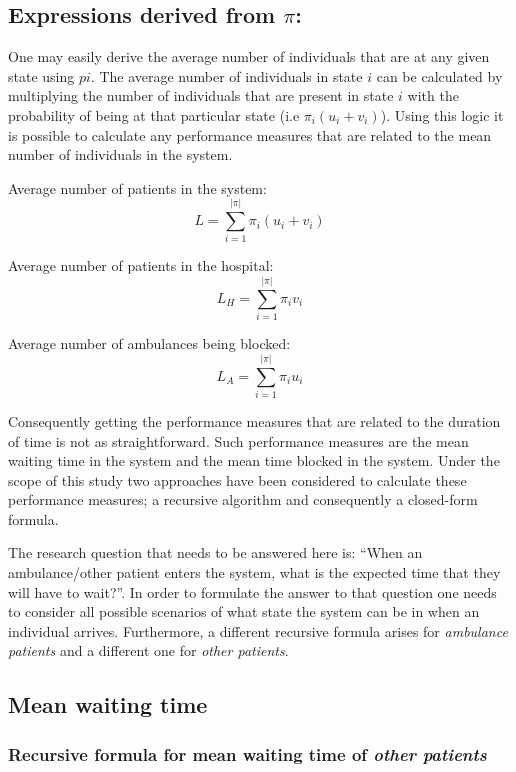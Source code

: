 \subsection{Expressions derived from \( \pi \):}
One may easily derive the average number of individuals that are at any given state using \( pi \). The average number of individuals in state \( i \) can be calculated by multiplying the number of individuals that are present in state \( i \) with the probability of being at that particular state (i.e \(\pi_i (u_i + v_i)\)). Using this logic it is possible to calculate any performance measures that are related to the mean number of individuals in the system.


Average number of patients in the system: 
\begin{equation}
    L = \sum_{i=1}^{|\pi|} \pi_i (u_i + v_i)
\end{equation} 

Average number of patients in the hospital: 
\begin{equation}
    L_H = \sum_{i=1}^{|\pi|} \pi_i v_i
\end{equation}

Average number of ambulances being blocked:
\begin{equation}
    L_A = \sum_{i=1}^{|\pi|} \pi_i u_i
\end{equation}

Consequently getting the performance measures that are related to the duration of time is not as straightforward. Such performance measures are the mean waiting time in the system and the mean time blocked in the system. Under the scope of this study two approaches have been considered to calculate these performance measures; a recursive algorithm and consequently a closed-form formula.

The research question that needs to be answered here is: ``When an ambulance/other patient enters the system, what is the expected time that they will have to wait?''. In order to formulate the answer to that question one needs to consider all possible scenarios of what state the system can be in when an individual arrives. Furthermore, a different recursive formula arises for \textit{ambulance patients} and a different one for \textit{other patients}.

\subsection{Mean waiting time}
\subsubsection{Recursive formula for mean waiting time of \textit{other patients}}

